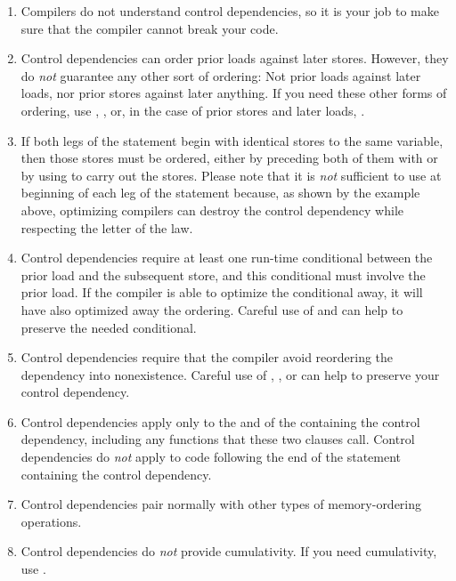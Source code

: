 \begin{enumerate}
\item	Compilers do not understand control dependencies, so it is
	your job to make sure that the compiler cannot break your code.

\item	Control dependencies can order prior loads against later stores.
	However, they do \emph{not} guarantee any other sort of ordering:
	Not prior loads against later loads, nor prior stores against
	later anything.
	If you need these other forms of ordering, use ,
	, or, in the case of prior stores and later loads,
	.

\item	If both legs of the  statement begin with identical stores
	to the same variable, then those stores must be ordered,
	either by preceding both of them with  or by using
	 to carry out the stores.
	Please note that it is \emph{not} sufficient to use 
	at beginning of each leg of the  statement because, as shown
	by the example above, optimizing compilers can destroy the control
	dependency while respecting the letter of the  law.

\item	Control dependencies require at least one run-time conditional
	between the prior load and the subsequent store, and this
	conditional must involve the prior load.
	If the compiler is able to optimize the conditional away, it
	will have also optimized away the ordering.
	Careful use of  and  can help
	to preserve the needed conditional.

\item	Control dependencies require that the compiler avoid reordering
	the dependency into nonexistence.
	Careful use of , , or
	 can help to preserve your control
	dependency.

\item	Control dependencies apply only to the  and
	 of the  containing the control
	dependency, including any functions that these two clauses call.
	Control dependencies do \emph{not} apply to code following the
	end of the  statement containing the control dependency.

\item	Control dependencies pair normally with other types of
	memory-ordering operations.

\item	Control dependencies do \emph{not} provide cumulativity.
	If you need cumulativity, use .
\end{enumerate}

